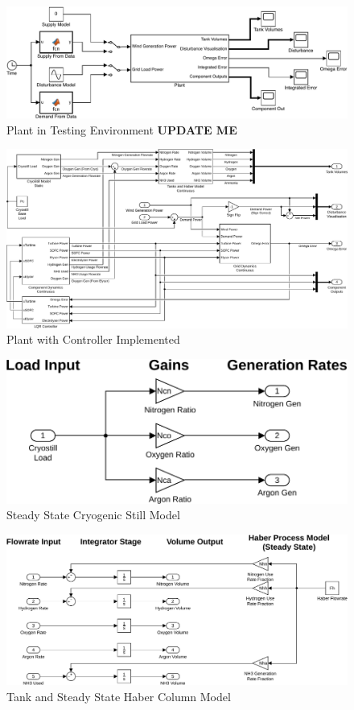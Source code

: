 \begin{figure}[p]
\centering
        \includegraphics[scale=0.7]{images/plant/global.pdf}
        \caption{Plant in Testing Environment {\textbf{\color{red}UPDATE ME}}}
        \label{fig:global}
\end{figure}
\begin{figure}[p]
\centering
        \includegraphics[scale=0.6]{images/plant2/plant.pdf}
    \caption{Plant with Controller Implemented}
        \label{fig:plant}
\end{figure}
\begin{figure}[p]
\centering
        \includegraphics[scale=0.7]{images/plant2/cryo.pdf}
    \caption{Steady State Cryogenic Still Model}
        \label{fig:cryo}
\end{figure}
\begin{figure}[p]
\centering
        \includegraphics[scale=0.65]{images/plant2/tank.pdf}
    \caption{Tank and Steady State Haber Column Model}
        \label{fig:tank}
\end{figure}
